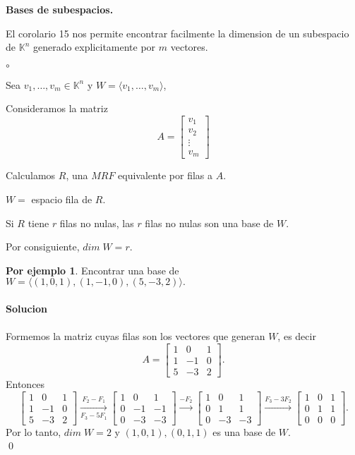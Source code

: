 \documentclass{article}
\theoremstyle{definition}
\theoremstyle{definition}
\newtheorem*{ej}{Por ejemplo}
\theoremstyle{remark}
\begin{document}
\begin{center}
\textbf{Bases de subespacios.}
\end{center}
El corolario 15 nos permite encontrar facilmente la dimension de un subespacio de $\mathbb{K}^n$ generado explicitamente por $m$ vectores. 
\begin{list}{$\circ$}{}  
\item Sea $v_1, \dots , v_m \in \mathbb{K}^n$ y $W=\langle v_1, \dots ,v_m \rangle$, 
\item Consideramos la matriz \[
    A=\begin{bmatrix} v_1 \\ v_2 \\ \vdots \\ v_m \end{bmatrix} 
  \]

  \item Calculamos $R$, una $MRF$ equivalente por filas a $A$. 
  \item $W=$ espacio fila de $R$. 
  \item Si $R$ tiene $r$ filas no nulas, las $r$ filas no nulas son una base de $W$. 
  \item Por consiguiente, $dim \; W=r$.
\end{list}\begin{ej}
  Encontrar una base de $W=\langle (1,0,1),(1,-1,0),(5,-3,2)\rangle.$ \\\\
  \textbf{Solucion}\\\\ 
  Formemos la matriz cuyas filas son los vectores que generan $W$, es decir \[
    A=\begin{bmatrix}1 & 0 & 1 \\ 1 & -1 & 0 \\ 5 & -3 & 2 \end{bmatrix}.
  \]
  Entonces \[
    \begin{bmatrix}1 & 0 & 1 \\ 1 & -1 & 0 \\ 5 &-3 & 2 \end{bmatrix}\underset{F_3-5F_1}{\xrightarrow{F_2-F_1}} \begin{bmatrix}1 & 0 & 1 \\ 0 & -1 & -1 \\ 0 & -3 & -3 \end{bmatrix}\xrightarrow{-F_2} \begin{bmatrix} 1 & 0 & 1 \\ 0 & 1 & 1 \\ 0 & -3 & -3 \end{bmatrix} \xrightarrow{F_3-3F_2} \begin{bmatrix}1 & 0 & 1 \\ 0 & 1 & 1 \\ 0 & 0 & 0 \end{bmatrix}.
  \]
  Por lo tanto, $dim\; W=2$ y $(1,0,1),(0,1,1)$ es una base de $W$. \\ \qed
\end{ej}
\end{document}
